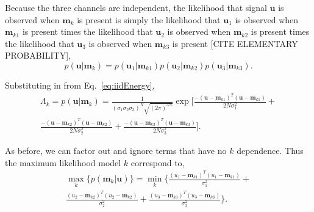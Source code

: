 Because the three channels are independent,  the likelihood that  signal $\mathbf{u}$ is observed when $\mathbf{m}_k$ is present is simply the likelihood that  $\mathbf{u}_1$ is observed when $\mathbf{m}_{k1}$ is present times the likelihood that  $\mathbf{u}_2$ is observed when $\mathbf{m}_{k2}$ is present times the likelihood that  $\mathbf{u}_3$ is observed when $\mathbf{m}_{k3}$ is present [CITE ELEMENTARY PROBABILITY],
\begin{equation}
p(\mathbf{u}|\mathbf{m}_k) = p(\mathbf{u}_1|\mathbf{m}_{k1})p(\mathbf{u}_2|\mathbf{m}_{k2})p(\mathbf{u}_3|\mathbf{m}_{k3}).
\end{equation}

Substituting in from Eq.~\ref{eq:iidEnergy},
\begin{multline}
\Lambda_k=p(\mathbf{u}|\mathbf{m}_k) =\frac{1}{ (\sigma_1\sigma_2\sigma_3)^N  \sqrt{ (2\pi)^{3N}}  }  \exp\Bigg[ \frac{-(\mathbf{u}-\mathbf{m}_{k1})^T(\mathbf{u}-\mathbf{m}_{k1})} {2 N \sigma_1^2 }   + \\ \frac{-(\mathbf{u}-\mathbf{m}_{k2})^T(\mathbf{u}-\mathbf{m}_{k2})} {2 N \sigma_2^2 } +\frac{-(\mathbf{u}-\mathbf{m}_{k3})^T(\mathbf{u}-\mathbf{m}_{k3})} {2 N \sigma_3^2 }    \Bigg].
\end{multline}

As before, we can factor out and ignore terms that have no $k$ dependence. Thus the maximum likelihood model $k$ correspond to,
\begin{multline}
\max_k   \big\{ p(\mathbf{m}_k|\mathbf{u}) \big\} =  \min_k  \Bigg\{  \frac{(u_1-\mathbf{m}_{k1})^T(u_1-\mathbf{m}_{k1})}{\sigma_1^2} +\\  
\frac{(u_2-\mathbf{m}_{k2})^T(u_2-\mathbf{m}_{k2})}{\sigma_2^2} + \frac{(u_3-\mathbf{m}_{k3})^T(u_3-\mathbf{m}_{k3})}{\sigma_3^2} \Bigg\}. 
\end{multline}




